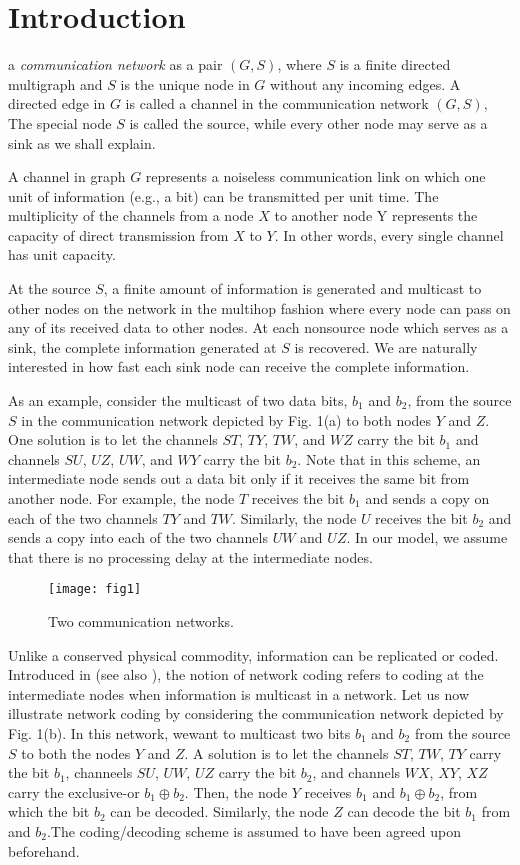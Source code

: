 \documentclass[journal]{IEEEtran}
\begin{document}
\section{Introduction}\label{sec:introduction}
 a \emph{communication network} as a pair $(G,S)$, where $S$ is a finite directed multigraph and $S$ is the unique node in $G$ without any incoming edges. A directed edge in $G$ is called a channel in the communication network $(G,S)$, The special node $S$ is called the source, while every other node may serve as a sink as we shall explain.
\par
A channel in graph $G$ represents a noiseless communication link on which one unit of information (e.g., a bit) can be transmitted per unit time. The multiplicity of the channels from a node $X$ to another node Y represents the capacity of direct transmission from $X$ to $Y$. In other words, every single channel has unit capacity.
\par
At the source $S$, a finite amount of information is generated and multicast to other nodes on the network in the multihop fashion where every node can pass on any of its received data to other nodes. At each nonsource node which serves as a sink, the complete information generated at $S$ is recovered. We are naturally interested in how fast each sink node can receive the complete information.
\par
As an example, consider the multicast of two data bits, $b_1$ and $b_2$, from the source $S$ in the communication network depicted by Fig. 1(a) to both nodes $Y$ and $Z$. One solution is to let the channels $ST$, $TY$, $TW$, and $WZ$ carry the bit $b_1$ and channels $SU$, $UZ$, $UW$, and $WY$ carry the bit $b_2$. Note that in this scheme, an intermediate node sends out a data bit only if it receives the same bit from another node. For example, the node $T$ receives the bit $b_1$ and sends a copy on each of the two channels $TY$ and $TW$. Similarly, the node $U$ receives the bit $b_2$ and sends a copy into each of the two channels $UW$ and $UZ$. In our model, we assume that there is no processing delay at the intermediate nodes.
\begin{figure}[H]
	\centering
	\texttt{[image: fig1]}
	\caption{Two communication networks.}
	\label{fig1}
\end{figure}
\par
Unlike a conserved physical commodity, information can be replicated or coded. Introduced in \cite{RNSNetwork} (see also \cite{YeungA}), the notion of network coding refers to coding at the intermediate nodes when information is multicast in a network. Let us now illustrate network coding by considering the communication network depicted by Fig. 1(b). In this network, wewant to multicast two bits $b_1$ and $b_2$ from the source $S$ to both the nodes $Y$ and $Z$. A solution is to let the channels $ST$, $TW$, $TY$ carry the bit $b_1$, channeels $SU$, $UW$, $UZ$ carry the bit $b_2$, and channels $WX$, $XY$, $XZ$ carry the exclusive-or $b_1 \oplus b_2$. Then, the node $Y$ receives $b_1$ and $b_1 \oplus b_2$, from which the bit $b_2$ can be decoded. Similarly, the node $Z$ can decode the bit $b_1$ from and $b_2$.The coding/decoding scheme is assumed to have been agreed upon beforehand.
\end{document}
